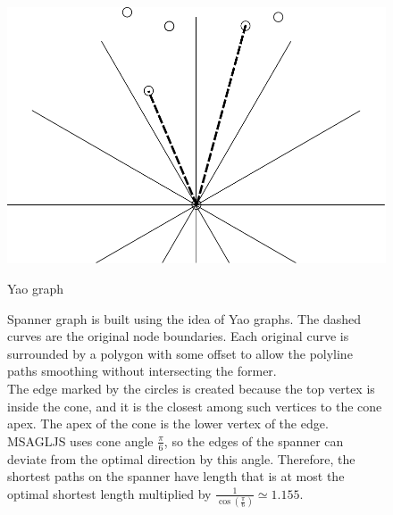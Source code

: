 \documentclass{llncs}
\begin{document}
\begin{figure}[]
  \centering
  \begin{minipage}[b]{0.5\textwidth}
    \includegraphics[width=\textwidth]{yao.pdf}
    \caption{\small{Yao graph}}
    \label{fig:yao}
  \end{minipage}
  \vfill
  \begin{minipage}[b]{\textwidth}
    
    \caption{\small{Spanner graph is built using the idea of Yao graphs. The dashed curves are the original node boundaries. Each original curve is surrounded by a polygon with some offset to allow the polyline paths smoothing without intersecting the former. \\
        The edge marked by the circles is created because the top vertex is inside the cone, and it is the closest among such vertices to the cone apex. The apex of the cone is the lower vertex of the edge. \\MSAGLJS uses cone angle $\frac{\pi}{6}$, so the edges of the spanner can deviate from the optimal direction by this angle. Therefore, the shortest paths on the spanner have length that is at most the optimal shortest length multiplied by $\frac{1}{\cos(\frac{\pi}{6})} \simeq 1.155$.}
    }
    \label{fig:spanner}
  \end{minipage}
\end{figure}
\end{document}
